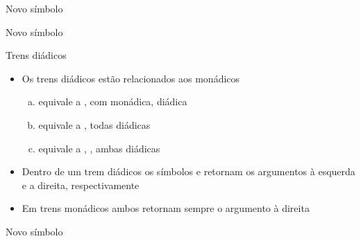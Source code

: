 \begin{frame}[fragile]{Novo símbolo}


\end{frame}

\begin{frame}[fragile]{Novo símbolo}

\end{frame}

\begin{frame}[fragile]{Trens diádicos}

    \begin{itemize}
        \item Os trens diádicos estão relacionados aos monádicos
        \pause

        \begin{enumerate}[(a)]
            \item {} equivale a , com  monádica,
 diádica
        \pause

            \item {} equivale a , todas diádicas
        \pause
            \item {} equivale a , , ambas diádicas
        \end{enumerate}
        \pause

        \item Dentro de um trem diádicos os símbolos  e  retornam os argumentos à esquerda e a direita, respectivamente
        \pause

        \item Em trens monádicos ambos retornam sempre o argumento à direita
 
    \end{itemize}

\end{frame}

\begin{frame}[fragile]{Novo símbolo}
\end{frame}

